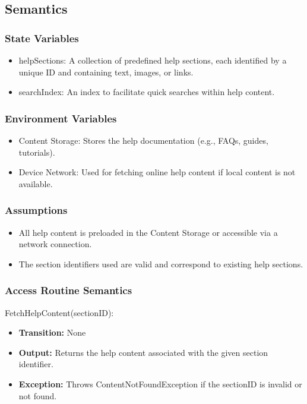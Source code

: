 \documentclass[12pt, titlepage]{article}
\begin{document}
\subsection{Semantics}

\subsubsection{State Variables}

\begin{itemize}
  \item helpSections: A collection of predefined help sections, each identified by a unique ID and containing text, images, or links.
  \item searchIndex: An index to facilitate quick searches within help content.
\end{itemize}

\subsubsection{Environment Variables}

\begin{itemize}
  \item Content Storage: Stores the help documentation (e.g., FAQs, guides, tutorials).
  \item Device Network: Used for fetching online help content if local content is not available.
\end{itemize}

\subsubsection{Assumptions}

\begin{itemize}
  \item All help content is preloaded in the Content Storage or accessible via a network connection.
  \item The section identifiers used are valid and correspond to existing help sections.
\end{itemize}

\subsubsection{Access Routine Semantics}

\noindent FetchHelpContent(sectionID):
\begin{itemize}
  \item \textbf{Transition:} None
  \item \textbf{Output:} Returns the help content associated with the given section identifier.
  \item \textbf{Exception:} Throws ContentNotFoundException if the sectionID is invalid or not found.
\end{itemize}
\end{document}
